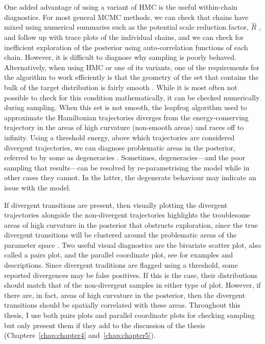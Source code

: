 One added advantage of using a variant of HMC is the useful within-chain diagnostics. For most general MCMC methods, we can check that chains have mixed using numerical summaries such as the potential scale reduction factor, $\hat{R}$ \citep{Gelman1992}, and follow up with trace plots of the individual chains, and we can check for inefficient exploration of the posterior using auto-correlation functions of each chain. However, it is difficult to diagnose why sampling is poorly behaved. Alternatively, when using HMC or one of its variants, one of the requirements for the algorithm to work efficiently is that the geometry of the set that contains the bulk of the target distribution is fairly smooth \citep{gabry_vis_2019}. While it is most often not possible to check for this condition mathematically, it can be checked numerically during sampling. When this set is not smooth, the leapfrog algorithm used to approximate the Hamiltonian trajectories diverges from the energy-conserving trajectory in the areas of high curvature (non-smooth areas) and races off to infinity. Using a threshold energy, above which trajectories are considered divergent trajectories, we can diagnose problematic areas in the posterior\citep{gabry_vis_2019}, referred to by some as degeneracies \citep{betancourt_2020}. Sometimes, degeneracies---and the poor sampling that results---can be resolved by re-parametrising the model \citep{betancourt2015} while in other cases they cannot. In the latter, the degenerate behaviour may indicate an issue with the model.

If divergent transitions are present, then visually plotting the divergent trajectories alongside the non-divergent trajectories highlights the troublesome areas of high curvature in the posterior that obstructs exploration, since the true divergent transitions will be clustered around the problematic areas of the parameter space \citep{gabry_vis_2019}. Two useful visual diagnostics are the bivariate scatter plot, also called a pairs plot, and the parallel coordinate plot, see \citep{gabry_vis_2019} for examples and descriptions. Since divergent traditions are flagged using a threshold, some reported divergences may be false positives. If this is the case, their distributions should match that of the non-divergent samples in either type of plot. However, if there are, in fact, areas of high curvature in the posterior, then the divergent transitions should be spatially correlated with these areas. Throughout this thesis, I use both pairs plots and parallel coordinate plots for checking sampling but only present them if they add to the discussion of the thesis (Chapters~\ref{chap:chapter4} and~\ref{chap:chapter5}).

